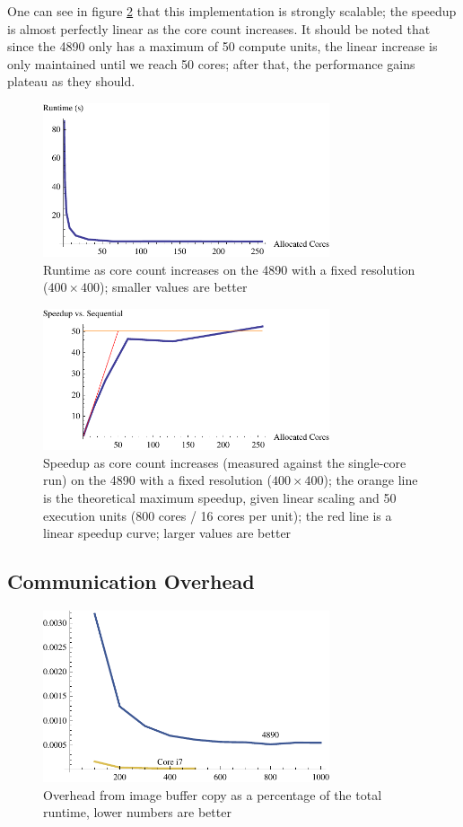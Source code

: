 \documentclass{acmsiggraph}
\begin{document}
One can see in figure \ref{fig:strongPlotTwo} that this implementation is strongly scalable; the speedup is almost perfectly linear as the core count increases. It should be noted that since the 4890 only has a maximum of 50 compute units, the linear increase is only maintained until we reach 50 cores; after that, the performance gains plateau as they should.

\begin{figure}
    \includegraphics[width=84.5mm]{strongPlotOne.pdf}
    \caption{Runtime as core count increases on the 4890 with a fixed resolution ($400\times400$); smaller values are better}
    \label{fig:strongPlotOne}
\end{figure}

\begin{figure}
    \includegraphics[width=84.5mm]{strongPlotTwo.pdf}
    \caption{Speedup as core count increases (measured against the single-core run) on the 4890 with a fixed resolution ($400\times400$); the orange line is the theoretical maximum speedup, given linear scaling and 50 execution units (800 cores / 16 cores per unit); the red line is a linear speedup curve; larger values are better}
    \label{fig:strongPlotTwo}
\end{figure}

\subsection{Communication Overhead}

\begin{figure}
    \includegraphics[width=84.5mm]{overheadPlot.pdf}
    \caption{Overhead from image buffer copy as a percentage of the total runtime, lower numbers are better}
    \label{fig:overheadPlot}
\end{figure}
\end{document}
